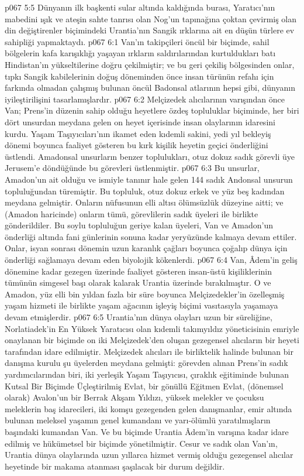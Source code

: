 \vs p067 5:5 Dünyanın ilk başkenti sular altında kaldığında burası, Yaratıcı’nın mabedini ışık ve ateşin sahte tanrısı olan Nog’un tapınağına çoktan çevirmiş olan din değiştirenler biçimindeki Urantia’nın Sangik ırklarına ait en düşün türlere ev sahipliği yapmaktaydı.
\vs p067 6:1 Van’ın takipçileri öncül bir biçimde, sahil bölgelerin kafa karışıklığı yaşayan ırkların saldırılarından kurtuldukları batı Hindistan’ın yükseltilerine doğru çekilmiştir; ve bu geri çekiliş bölgesinden onlar, tıpkı Sangik kabilelerinin doğuş döneminden önce insan türünün refahı için farkında olmadan çalışmış bulunan öncül Badonsal atlarının hepsi gibi, dünyanın iyileştirilişini tasarlamışlardır.
\vs p067 6:2 Melçizedek alıcılarının varışından önce Van; Prens’in düzenin sahip olduğu heyetlere özdeş topluluklar biçiminde, her biri dört unsurdan meydana gelen on heyet içerisinde insan olaylarının idaresini kurdu. Yaşam Taşıyıcıları’nın ikamet eden kıdemli sakini, yedi yıl bekleyiş dönemi boyunca faaliyet gösteren bu kırk kişilik heyetin geçici önderliğini üstlendi. Amadonsal unsurların benzer toplulukları, otuz dokuz sadık görevli üye Jerusem’e döndüğünde bu görevleri üstlenmiştir.
\vs p067 6:3 Bu  unsurlar, Amadon’un ait olduğu ve ismiyle tanınır hale gelen 144 sadık Andonsal unsurun topluluğundan türemiştir. Bu topluluk, otuz dokuz erkek ve yüz beş kadından meydana gelmiştir. Onların nüfusunun elli altısı ölümsüzlük düzeyine aitti; ve (Amadon haricinde) onların tümü, görevlilerin sadık üyeleri ile birlikte gönderildiler. Bu soylu topluluğun geriye kalan üyeleri, Van ve Amadon’un önderliği altında fani günlerinin sonuna kadar yeryüzünde kalmaya devam ettiler. Onlar, isyan sonrası dönemin uzun karanlık çağları boyunca çoğalıp dünya için önderliği sağlamaya devam eden biyolojik kökenlerdi.
\vs p067 6:4 Van, Âdem’in geliş dönemine kadar gezegen üzerinde faaliyet gösteren insan\hyp{}üstü kişiliklerinin tümünün simgesel başı olarak kalarak Urantia üzerinde bırakılmıştır. O ve Amadon, yüz elli bin yıldan fazla bir süre boyunca Melçizedekler’in özelleşmiş yaşam hizmeti ile birlikte yaşam ağacının işleyiş biçimi vasıtasıyla yaşamaya devam etmişlerdir.
\vs p067 6:5 Urantia’nın dünya olayları uzun bir süreliğine, Norlatiadek’in En Yüksek Yaratıcısı olan kıdemli takımyıldız yöneticisinin emriyle onaylanan bir biçimde on iki Melçizedek’den oluşan gezegensel alıcıların bir heyeti tarafından idare edilmiştir. Melçizedek alıcıları ile birliktelik halinde bulunan bir danışma kurulu şu üyelerden meydana gelmişti: görevden alınan Prens’in sadık yardımcılarından biri, iki yerleşik Yaşam Taşıyıcısı, çıraklık eğitiminde bulunan Kutsal Bir Biçimde Üçleştirilmiş Evlat, bir gönüllü Eğitmen Evlat, (dönemsel olarak) Avalon’un bir Berrak Akşam Yıldızı, yüksek melekler ve çocuksu meleklerin baş idarecileri, iki komşu gezegenden gelen danışmanlar, emir altında bulunan meleksel yaşamın genel kumandanı ve yarı\hyp{}ölümlü yaratılmışların başındaki kumandan Van. Ve bu biçimde Urantia Âdem’in varışına kadar idare edilmiş ve hükümetsel bir biçimde yönetilmiştir. Cesur ve sadık olan Van’ın, Urantia dünya olaylarında uzun yıllarca hizmet vermiş olduğu gezegensel alıcılar heyetinde bir makama atanması şaşılacak bir durum değildir.
